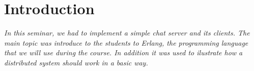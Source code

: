 \section{Introduction}

\textit{In this seminar, we had to implement a simple chat server and its clients. 
The main topic was introduce to the students to Erlang, the programming language that we will use during the course. 
In addition it was used to ilustrate how a distributed system should work in a basic way.}